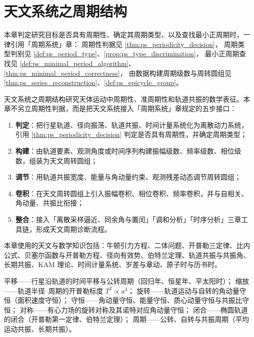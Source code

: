 \chapter{天文系统之周期结构}
\label{chap:astro-periodic}

\begin{remark}[本章目标的周期性判定（引用）]\label{rem:astro_ps_hook}
本章判定研究目标是否具有周期性、确定其周期类型、以及查找最小正周期时，一律引用「周期系统」章：
周期性判据见 \cref{thm:ps_periodicity_decision}，
周期类型判别见 \cref{def:ps_period_type}、\cref{prop:ps_type_discrimination}，
最小正周期查找见 \cref{def:ps_minimal_period_algorithm}、\cref{thm:ps_minimal_period_correctness}，
由数据构建周期级数与周转圆组见 \cref{thm:ps_series_reconstruction}、\cref{def:ps_epicycle_group}。
\end{remark}

\begin{remark}\label{rem:astro_chapter_positioning}
天文系统之周期结构研究天体运动中周期性、准周期性和轨道共振的数学表征。本章不另立周期性判据，而是把天文系统接入「周期系统」章规定的五步接口：
\begin{enumerate}[label=(\arabic*)]
    \item \textbf{判定}：把行星轨道、径向振荡、轨道共振、时间计量系统化为离散动力系统，引用 \cref{thm:ps_periodicity_decision} 判定是否具有周期性，并确定周期类型；
    \item \textbf{构建}：由轨道要素、观测角度或时间序列构建振幅级数、频率级数、相位级数，组装为天文周转圆组；
    \item \textbf{调节}：用轨道共振宽度、能量与角动量约束、观测残差动态调节周转圆组；
    \item \textbf{卷积}：在天文周转圆组上引入振幅卷积、相位卷积、频率卷积，并与自相关、角动量、共振比衔接；
    \item \textbf{整合}：接入「离散采样逼近、同余角与置闰」「调和分析」「时序分析」三章工具链，形成天文周期诊断流程。
\end{enumerate}
本章使用的天文与数学知识包括：牛顿引力方程、二体问题、开普勒三定律、比内公式、贝塞尔函数与开普勒方程、径向有效势、伯特兰定理、轨道共振与共振角、长期共振、KAM 理论、时间计量系统、岁差与章动、原子时与历书时。
\end{remark}

\begin{remark}[本章七主题导引]\label{rem:astro_seven_themes}
平移——行星沿轨道的时间平移与公转周期（回归年、恒星年、平太阳时）；
缩放——轨道半径--周期的开普勒标度 \(T^2\propto a^3\)；
旋转——轨道运动与自转的角动量守恒（面积速度守恒）；
守恒——角动量守恒、能量守恒、质心动量守恒与共振比守恒；
对称——有心力场的旋转对称及其诺特对应角动量守恒；
闭合——椭圆轨道的闭合（开普勒第一定律、伯特兰定理）；
周期——公转、自转与共振周期（平均运动共振、长期共振）。
\end{remark}

